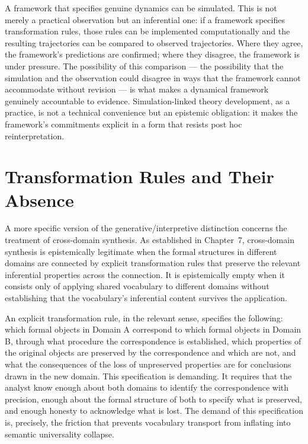 \documentclass[12pt, openright, twoside]{book}
\begin{document}
A framework that specifies genuine dynamics can be simulated. This is
not merely a practical observation but an inferential one: if a framework
specifies transformation rules, those rules can be implemented computationally
and the resulting trajectories can be compared to observed trajectories.
Where they agree, the framework's predictions are confirmed; where they
disagree, the framework is under pressure. The possibility of this
comparison --- the possibility that the simulation and the observation
could disagree in ways that the framework cannot accommodate without
revision --- is what makes a dynamical framework genuinely accountable to
evidence. Simulation-linked theory development, as a practice, is not a
technical convenience but an epistemic obligation: it makes the framework's
commitments explicit in a form that resists post hoc reinterpretation.

\section{Transformation Rules and Their Absence}

A more specific version of the generative/interpretive distinction concerns
the treatment of cross-domain synthesis. As established in Chapter~7,
cross-domain synthesis is epistemically legitimate when the formal structures
in different domains are connected by explicit transformation rules that
preserve the relevant inferential properties across the connection. It is
epistemically empty when it consists only of applying shared vocabulary
to different domains without establishing that the vocabulary's inferential
content survives the application.

An explicit transformation rule, in the relevant sense, specifies the
following: which formal objects in Domain A correspond to which formal
objects in Domain B, through what procedure the correspondence is established,
which properties of the original objects are preserved by the correspondence
and which are not, and what the consequences of the loss of unpreserved
properties are for conclusions drawn in the new domain. This specification
is demanding. It requires that the analyst know enough about both domains
to identify the correspondence with precision, enough about the formal
structure of both to specify what is preserved, and enough honesty to
acknowledge what is lost. The demand of this specification is, precisely,
the friction that prevents vocabulary transport from inflating into semantic
universality collapse.
\end{document}
